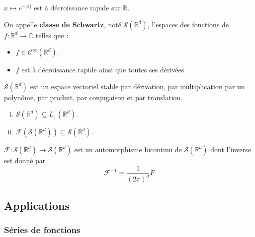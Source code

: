 	\begin{example}
		$x \mapsto e^{-\vert x \vert}$ est à décroissance rapide sur $\mathbb{R}$.
	\end{example}
	
	\begin{definition}
		On appelle \textbf{classe de Schwartz}, noté $\mathcal{S}(\mathbb{R}^d)$, l'espaces des fonctions de $f : \mathbb{R}^d \rightarrow \mathbb{C}$ telles que :
		\begin{itemize}
			\item $f \in \mathcal{C}^\infty(\mathbb{R}^d)$.
			\item $f$ est à décroissance rapide ainsi que toutes ses dérivées.
		\end{itemize}
	\end{definition}
	
	\begin{proposition}
		$\mathcal{S}(\mathbb{R}^d)$ est un espace vectoriel stable par dérivation, par multiplication par un polynôme, par produit, par conjugaison et par translation.
	\end{proposition}
	
	\begin{theorem}
		\begin{enumerate}[(i)]
			\item $\mathcal{S}(\mathbb{R}^d) \subseteq L_1(\mathbb{R}^d)$.
			\item $\mathcal{F}(\mathcal{S}(\mathbb{R}^d)) \subseteq \mathcal{S}(\mathbb{R}^d)$.
		\end{enumerate}
	\end{theorem}
	
	\begin{theorem}
		$\mathcal{F} : \mathcal{S}(\mathbb{R}^d) \rightarrow \mathcal{S}(\mathbb{R}^d)$ est un automorphisme bicontinu de $\mathcal{S}(\mathbb{R}^d)$ dont l'inverse est donné par
		\[ \mathcal{F}^{-1} = \frac{1}{(2 \pi)^d} \overline{F} \]
	\end{theorem}
	
	\subsection{Applications}
	
	\subsubsection{Séries de fonctions}
	
	
